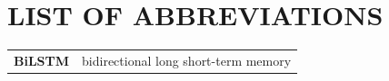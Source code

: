 
\section*{LIST OF ABBREVIATIONS}

\begin{tabular}{p{3cm}l}
  \textbf{BiLSTM}          & bidirectional long short-term memory\\
\end{tabular}

